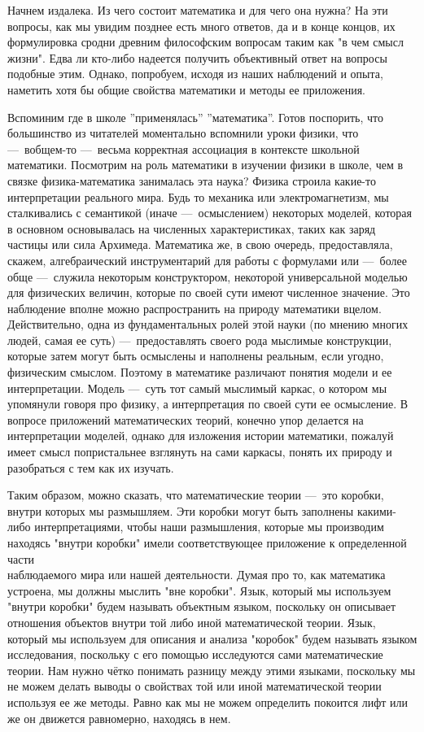 \documentclass[math.tex]{subfiles}
\begin{document}
	Начнем издалека.
Из чего состоит математика и для чего она нужна?
На эти вопросы, как мы увидим позднее есть много ответов, да и в конце концов, их формулировка сродни древним философским вопросам таким как "в чем смысл жизни".
Едва ли кто-либо надеется получить объективный ответ на вопросы \linebreak подобные этим.
Однако, попробуем, исходя из наших наблюдений и опыта, \linebreak наметить хотя бы общие свойства математики и методы ее приложения.

	Вспоминим где в школе ''применялась'' ''математика''. 
Готов поспорить, что большинство из читателей моментально вспомнили уроки физики, что —\ вобщем-то —\ весьма корректная ассоциация в контексте школьной математики.
Посмотрим на роль математики в изучении физики в школе, чем в связке физика-математика занималась эта наука?
Физика строила какие-то интерпретации реального мира.
Будь то механика или электромагнетизм, мы сталкивались с семантикой (иначе —\ осмыслением) некоторых моделей, которая в основном основывалась на численных характеристиках, таких как заряд частицы или сила Архимеда.
Математика же, в свою очередь, предоставляла, скажем, алгебраический инструментарий для работы с формулами или —\ более обще —\ служила некоторым конструктором, некоторой универсальной моделью для физических величин, которые по своей сути имеют численное значение.
Это наблюдение вполне можно распространить на природу математики вцелом.
Действительно, одна из фундаментальных ролей этой науки (по мнению многих людей, самая ее суть) —\ предоставлять своего рода мыслимые конструкции, ко\-то\-рые затем могут быть осмыслены и наполнены реальным, если угодно, физи\-ческим смыслом.
Поэтому в математике различают понятия модели и ее интерпретации.
Модель —\ суть тот самый мыслимый каркас, о котором мы упомянули говоря про физику, а интерпретация по своей сути ее осмысление.
В вопросе приложений математических теорий, конечно упор делается на интер\-претации моделей, однако для изложения истории математики, пожалуй име\-ет смысл попристальнее взглянуть на сами каркасы, понять их природу и разоб\-раться с тем как их изучать.

	Таким образом, можно сказать, что математические теории —\ это коробки, внутри которых мы размышляем.
Эти коробки могут быть заполнены какими-либо интерпретациями, чтобы наши размышления, которые мы производим находясь "внутри коробки" имели соответствующее приложение к определенной части \\наблюдаемого мира или нашей деятельности.
Думая про то, как математика ус\-троена, мы должны мыслить "вне коробки".
Язык, который мы используем "внутри коробки" будем называть объектным языком, поскольку он описывает отношения объектов внутри той либо иной математической теории.
Язык, который мы ис\-пользуем для описания и анализа "коробок" будем называть языком исследования, поскольку с его помощью исследуются сами математические теории.
Нам нужно чётко понимать разницу между этими языками, поскольку мы не можем делать выводы о свойствах той или иной математической теории используя ее же методы.
Равно как мы не можем определить покоится лифт или же он движется равномерно, находясь в нем.
\end{document}
